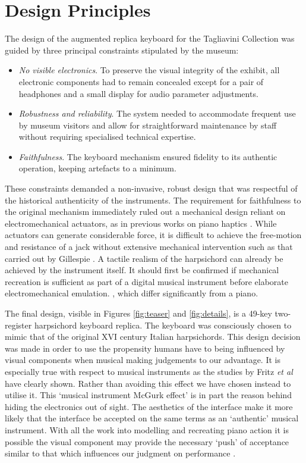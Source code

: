 \section{Design Principles}\label{design}

The design of the augmented replica keyboard for the Tagliavini Collection was guided by three principal constraints stipulated by the museum:
\begin{itemize}
\item \emph{No visible electronics}. To preserve the visual integrity of the exhibit, all electronic components had to remain concealed except for a pair of headphones and a small display for audio parameter adjustments.
\item \emph{Robustness and reliability}. The system needed to accommodate frequent use by museum visitors and allow for straightforward maintenance by staff without requiring specialised technical expertise.
\item \emph{Faithfulness}. The keyboard mechanism ensured fidelity to its authentic operation, keeping artefacts to a minimum. 
\end{itemize}

These constraints demanded a non-invasive, robust design that was respectful of the historical authenticity of the instruments. The requirement for faithfulness to the original mechanism immediately ruled out a mechanical design reliant on electromechanical actuators, as in previous works on piano haptics \cite{Timmermans2020,Gillespie1996}. 
While actuators can generate considerable force, it is difficult to achieve the free-motion and resistance of a jack without extensive mechanical intervention such as that carried out by Gillespie \cite{Gillespie1996}. A tactile realism of the harpsichord can already be achieved by the instrument itself. It should first be confirmed if mechanical recreation is sufficient as part of a digital musical instrument before elaborate electromechanical emulation.
, which differ significantly from a piano.

The final design, visible in Figures \ref{fig:teaser} and \ref{fig:details}, is a 49-key two-register harpsichord keyboard replica.
The keyboard was consciously chosen to mimic that of the original XVI century Italian harpsichords. This design decision was made in order to use the propensity humans have to being influenced by visual components when musical making judgements \cite{Tsay2013} to our advantage. It is especially true with respect to musical instruments as the studies by Fritz \emph{et al}\cite{Fritz2012, Fritz2014, Fritz2017} have clearly shown. Rather than avoiding this effect we have chosen instead to utilise it. This `musical instrument McGurk effect' is in part the reason behind hiding the electronics out of sight. 
The aesthetics of the interface make it more likely that the interface be accepted on the same terms as an `authentic' musical instrument. With all the work into modelling and recreating piano action \cite{Cadoz1990, Gillespie1996, Timmermans2020} it is possible the visual component may provide the necessary `push' of acceptance similar to that which influences our judgment on performance \cite{Tsay2013}. 

